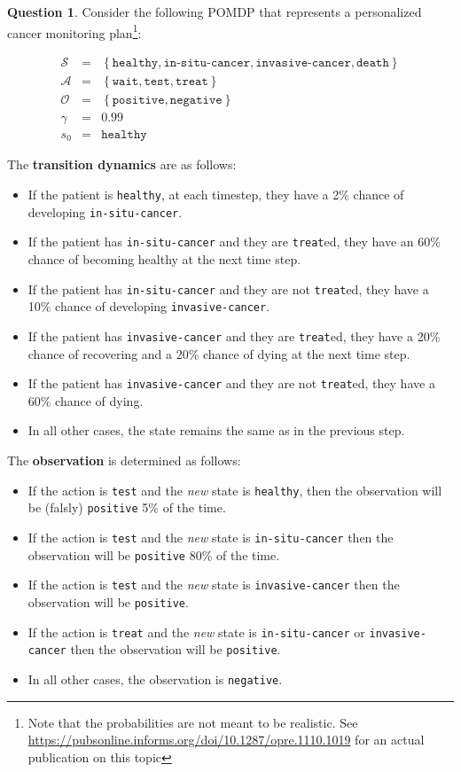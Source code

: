 \documentclass{article}
\theoremstyle{definition}
\newtheorem{question}[thm]{Question}
\begin{document}
\begin{question}
Consider the following POMDP that represents a personalized cancer monitoring plan\footnote{Note that the probabilities are not meant to be realistic. See \url{https://pubsonline.informs.org/doi/10.1287/opre.1110.1019} for an actual publication on this topic}:

\begin{eqnarray*}
    \mathcal{S} &=& \left\{\texttt{healthy}, \texttt{in-situ-cancer}, \texttt{invasive-cancer}, \texttt{death}\right\}\\
    \mathcal{A} &=& \left\{\texttt{wait}, \texttt{test}, \texttt{treat}\right\}\\
    \mathcal{O} &=& \left\{\texttt{positive}, \texttt{negative}\right\}\\
    \gamma &=& 0.99\\
    s_0 &=& \texttt{healthy}
\end{eqnarray*}

The \textbf{transition dynamics} are as follows:
\begin{itemize}[noitemsep]
    \item If the patient is \texttt{healthy}, at each timestep, they have a 2\% chance of developing \texttt{in-situ-cancer}.
    \item If the patient has \texttt{in-situ-cancer} and they are \texttt{treat}ed, they have an 60\% chance of becoming healthy at the next time step.
    \item If the patient has \texttt{in-situ-cancer} and they are not \texttt{treat}ed, they have a 10\% chance of developing \texttt{invasive-cancer}.
    \item If the patient has \texttt{invasive-cancer} and they are \texttt{treat}ed, they have a 20\% chance of recovering and a 20\% chance of dying at the next time step.
    \item If the patient has \texttt{invasive-cancer} and they are not \texttt{treat}ed, they have a 60\% chance of dying.
    \item In all other cases, the state remains the same as in the previous step.
\end{itemize}

The \textbf{observation} is determined as follows:
\begin{itemize}[noitemsep]
    \item If the action is \texttt{test} and the \emph{new} state is \texttt{healthy}, then the observation will be (falsly) \texttt{positive} 5\% of the time. 
    \item If the action is \texttt{test} and the \emph{new} state is \texttt{in-situ-cancer} then the observation will be \texttt{positive} 80\% of the time.
    \item If the action is \texttt{test} and the \emph{new} state is \texttt{invasive-cancer} then the observation will be \texttt{positive}.
    \item If the action is \texttt{treat} and the \emph{new} state is \texttt{in-situ-cancer} or \texttt{invasive-cancer} then the observation will be \texttt{positive}.
    \item In all other cases, the observation is \texttt{negative}.
\end{itemize}


\end{question}
\end{document}
